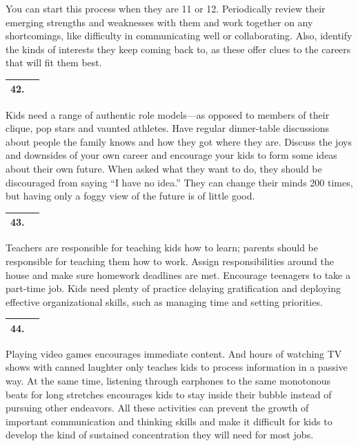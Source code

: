 You can start this process when they are 11 or 12. Periodically review
their emerging strengths and weaknesses with them and work together on
any shortcomings, like difficulty in communicating well or
collaborating. Also, identify the kinds of interests they keep coming
back to, as these offer clues to the careers that will fit them best.

 \begin{tabular}{|c|c|}
	\hline 
	42.  &   \hspace{10em}  \\ 
	\hline 
\end{tabular}

Kids need a range of authentic role models---as opposed to members of
their clique, pop stars and vaunted athletes. Have regular dinner-table
discussions about people the family knows and how they got where they
are. Discuss the joys and downsides of your own career and encourage
your kids to form some ideas about their own future. When asked what
they want to do, they should be discouraged from saying ``I have no
idea.'' They can change their minds 200 times, but having only a foggy
view of the future is of little good.

 \begin{tabular}{|c|c|}
	\hline 
	43.  &   \hspace{10em}  \\ 
	\hline 
\end{tabular}

Teachers are responsible for teaching kids how to learn; parents should
be responsible for teaching them how to work. Assign responsibilities
around the house and make sure homework deadlines are met. Encourage
teenagers to take a part-time job. Kids need plenty of practice delaying
gratification and deploying effective organizational skills, such as
managing time and setting priorities.

 \begin{tabular}{|c|c|}
	\hline 
	44.  &   \hspace{10em}  \\ 
	\hline 
\end{tabular}

Playing video games encourages immediate content. And hours of watching
TV shows with canned laughter only teaches kids to process information
in a passive way. At the same time, listening through earphones to the
same monotonous beats for long stretches encourages kids to stay inside
their bubble instead of pursuing other endeavors. All these activities
can prevent the growth of important communication and thinking skills
and make it difficult for kids to develop the kind of sustained
concentration they will need for most jobs.



